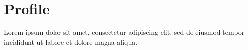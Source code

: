 \documentclass{vitae}
\begin{document}
\makemasthead

\section{Profile}
Lorem ipsum dolor sit amet, consectetur adipiscing elit, sed do eiusmod
tempor incididunt ut labore et dolore magna aliqua.

\end{document}
